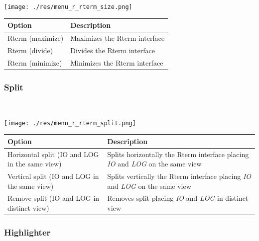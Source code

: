 \texttt{[image: ./res/menu\_r\_rterm\_size.png]}\\

\begin{scriptsize}
  \begin{tabularx}{\textwidth}{>{\hsize=0.3\hsize}X>{\hsize=0.7\hsize}X}\\
    \hline
    \textbf{Option} & \textbf{Description} \\
    \hline
    Rterm (maximize) & Maximizes the Rterm interface \\
    Rterm (divide) & Divides the Rterm interface \\
    Rterm (minimize) & Minimizes the Rterm interface \\
    \hline
  \end{tabularx}
\end{scriptsize}


\newpage
\hypertarget{menu_r_rterm_split}{}
\subsubsection{Split}\\

\texttt{[image: ./res/menu\_r\_rterm\_split.png]}\\

\begin{scriptsize}
  \begin{tabularx}{\headwidth}{>{\hsize=0.6\hsize}X>{\hsize=0.7\hsize}X}\\
    \hline
    \textbf{Option} & \textbf{Description} \\
    \hline
    Horizontal split (IO and LOG in the same view) & Splits horizontally the Rterm interface placing \textit{IO} and \textit{LOG} on the same view \\
    Vertical split (IO and LOG in the same view) & Splits vertically the Rterm interface placing \textit{IO} and \textit{LOG} on the same view \\
    Remove split (IO and LOG in distinct view) & Removes split placing \textit{IO} and \textit{LOG} in distinct view \\
    \hline
  \end{tabularx}
\end{scriptsize}


\hypertarget{menu_r_rterm_highlighter}{}
\subsubsection{Highlighter}\\

